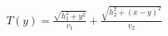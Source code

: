 \documentclass[preview]{standalone}
\begin{document}
\begin{align*}
T(y) = \frac{\sqrt{h_1^2 + y^2}}{v_1} + \frac{\sqrt{h_2^2 + (x-y)^2}}{v_2}
\end{align*}
\end{document}
